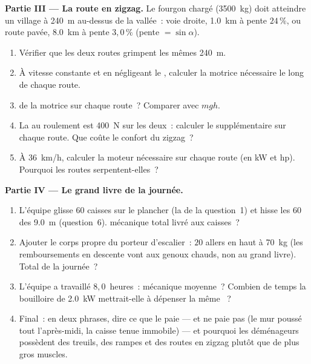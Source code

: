 \begin{problem}
\medskip
\noindent\textbf{Partie III --- La route en zigzag.}
Le fourgon chargé (\qty{3500}{kg}) doit atteindre un village à
\qty{240}{m} au-dessus de la vallée~: voie droite, \qty{1.0}{km} à
pente $24\,\%$, ou route pavée, \qty{8.0}{km} à pente $3{,}0\,\%$
(pente $= \sin\alpha$).
\begin{enumerate}[resume]
  \item Vérifier que les deux routes grimpent les mêmes \qty{240}{m}.
  \item À vitesse constante et en négligeant le
        , calculer la
         motrice nécessaire le long de
        chaque route.
  \item {} de la
         motrice sur chaque route~?
        Comparer avec $mgh$.
  \item La  au roulement est
        \qty{400}{N} sur les deux~: calculer le
         supplémentaire sur chaque
        route. Que coûte le confort du zigzag~?
  \item À \qty{36}{km/h}, calculer la
         moteur nécessaire sur
        chaque route (en \unit{kW} et \unit{hp}). Pourquoi les routes
        serpentent-elles~?
\end{enumerate}

\medskip
\noindent\textbf{Partie IV --- Le grand livre de la journée.}
\begin{enumerate}[resume]
  \item L'équipe glisse $60$ caisses sur le plancher (la  de la
        question~1) et hisse les $60$ des \qty{9.0}{m} (question~6).
         mécanique total livré aux
        caisses~?
  \item Ajouter le corps propre du porteur d'escalier~: $20$ allers en
        haut à \qty{70}{kg} (les remboursements en descente vont aux
        genoux chauds, non au grand livre). Total de la journée~?
  \item L'équipe a travaillé $8{,}0$~heures~:
         mécanique moyenne~?
        Combien de temps la bouilloire de \qty{2.0}{kW} mettrait-elle à
        dépenser la même
        ~?
  \item Final~: en deux phrases, dire ce que le
         paie --- et ne paie pas (le
        mur poussé tout l'après-midi, la caisse tenue immobile) --- et
        pourquoi les déménageurs possèdent des treuils, des rampes et
        des routes en zigzag plutôt que de plus gros muscles.
\end{enumerate}
\end{problem}
